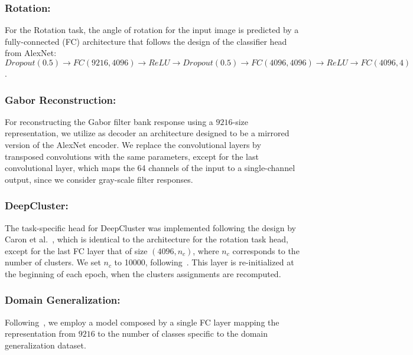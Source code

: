 \documentclass[runningheads]{llncs}
\begin{document}
\vspace{-5pt}\subsubsection{Rotation:} For the Rotation task, the angle of rotation for the input image is predicted by a fully-connected (FC) architecture that follows the design of the classifier head from AlexNet: $Dropout(0.5)\rightarrow FC(9216, 4096)\rightarrow ReLU\rightarrow Dropout(0.5)\rightarrow FC(4096,4096)\rightarrow ReLU\rightarrow FC(4096, 4)$. \vspace{-10pt}
\vspace{-5pt}\subsubsection{Gabor Reconstruction:} For reconstructing the Gabor filter bank response using a $9216$-size representation, we utilize as decoder an architecture designed to be a mirrored version of the AlexNet encoder. We replace the convolutional layers by transposed convolutions with the same parameters, except for the last convolutional layer, which maps the 64 channels of the input to a single-channel output, since we consider gray-scale filter responses.\vspace{-10pt}
\vspace{-5pt}\subsubsection{DeepCluster:} The task-specific head for DeepCluster was implemented following the design by Caron et al.~\cite{caron2018deep}, which is identical to the architecture for the rotation task head, except for the last FC layer that of size $(4096, n_c)$, where $n_c$ corresponds to the number of clusters. We set $n_c$ to 10000, following~\cite{caron2018deep}. This layer is re-initialized at the beginning of each epoch, when the clusters assignments are recomputed.\vspace{-10pt}
\vspace{-5pt}\subsubsection{Domain Generalization:} Following~\cite{kolesnikov2019revisiting}, we employ a model composed by a single FC layer mapping the representation from $9216$ to the number of classes specific to the domain generalization dataset. 
\end{document}
